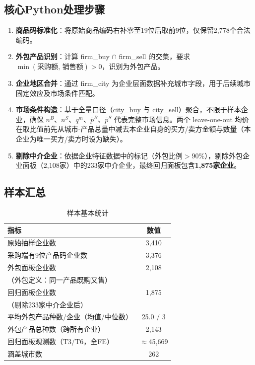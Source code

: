 \documentclass[12pt]{article}
\begin{document}
\subsection{核心Python处理步骤}

\begin{enumerate}[nosep, leftmargin=*]

  \item \textbf{商品码标准化}：将原始商品编码右补零至19位后取前9位，仅保留2,778个合法编码。

  \item \textbf{外包产品识别}：计算 firm\_buy $\cap$ firm\_sell 的交集，要求 $\min(\text{采购额},\,\text{销售额}) > 0$，识别为外包产品。

  \item \textbf{企业地区合并}：通过 firm\_city 为企业层面数据补充城市字段，用于后续城市固定效应及市场条件匹配。

  \item \textbf{市场条件构造}：基于全量口径（city\_buy 与 city\_sell）聚合，不限于样本企业，确保 $n^B$、$n^S$、$q^m$、$\bar{p}^{B}$、$\bar{p}^{S}$ 代表完整市场信息。两个 leave-one-out 均价在取比值前先从城市-产品总量中减去本企业自身的买方/卖方金额与数量（本企业为唯一买方/卖方时设为缺失）。

  \item \textbf{剔除中介企业}：依据企业特征数据中的标记（外包比例$>90\%$），剔除外包企业面板（2,108家）中的233家中介企业，最终回归面板包含\textbf{1,875家企业}。

\end{enumerate}

\subsection{样本汇总}

\begin{table}[H]
  \centering
  \caption{样本基本统计}
  \begin{tabular}{lc}
    \toprule
    指标 & 数值 \\
    \midrule
    原始抽样企业数                               & 3,410 \\
    采购端有9位产品码企业数                  & 3,376 \\
    外包面板企业数& 2,108 \\
    \quad（外包定义：同一产品既购又售）          & \\
    回归面板企业数    & 1,875 \\
    \quad（剔除233家中介企业后）                & \\
    平均外包产品种数/企业（均值/中位数）         & 25.0 / 3 \\
    外包产品总种数（跨所有企业）                 & 2,143 \\
    回归面板观测数（T3/T6，全FE）               & $\approx$45,669 \\
    涵盖城市数                                   & 262 \\
    \bottomrule
  \end{tabular}
\end{table}
\end{document}
